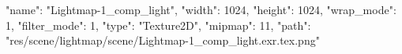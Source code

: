{
  "name": "Lightmap-1_comp_light",
  "width": 1024,
  "height": 1024,
  "wrap_mode": 1,
  "filter_mode": 1,
  "type": "Texture2D",
  "mipmap": 11,
  "path": "res/scene/lightmap/scene/Lightmap-1_comp_light.exr.tex.png"
}